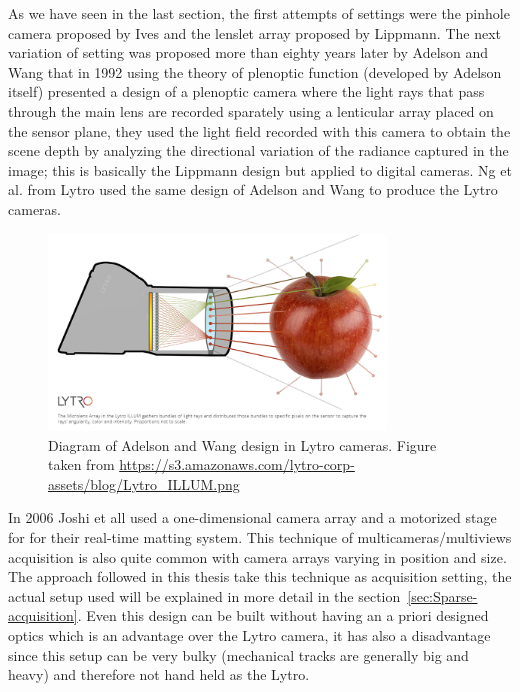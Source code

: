 \bigskip

As we have seen in the last section, the first attempts of settings were the pinhole camera proposed by Ives and the lenslet array proposed by Lippmann. The next variation of setting was proposed more than eighty years later by Adelson and Wang \cite{AdelsonWang} that in 1992 using the theory of plenoptic function (developed by Adelson itself) presented a design of a plenoptic camera where the light rays that pass through the main lens are recorded sparately using a lenticular array placed on the sensor plane, they used the light field recorded with this camera to obtain the scene depth by analyzing the directional variation of the radiance captured in the image; this is basically the Lippmann design but applied to digital cameras. Ng et al. \cite{Lytro} from Lytro used the same design of Adelson and Wang to produce the Lytro cameras.

\bigskip

\begin{figure}[h!]
\centering
\includegraphics[width= 0.80\textwidth]{./Diagrams/lytro_array.png}
\caption{Diagram of Adelson and Wang design in Lytro cameras. Figure taken from \url{https://s3.amazonaws.com/lytro-corp-assets/blog/Lytro_ILLUM.png}}
\end{figure}

\bigskip

In 2006 Joshi et all \cite{Joshi} used a one-dimensional camera array and a motorized stage for for their real-time matting system. This technique of multicameras/multiviews acquisition is also quite common with camera arrays varying in position and size. The approach followed in this thesis take this technique as acquisition setting, the actual setup used will be explained in more detail in the section~\ref{sec:Sparse-acquisition}. Even this design can be built without having an a priori designed optics which is an advantage over the Lytro camera, it has also a disadvantage since this setup can be very bulky (mechanical tracks are generally big and heavy) and therefore not hand held as the Lytro. 

